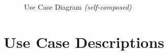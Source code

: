 \begin{figure}[h!]
\centering
{}
\caption{Use Case Diagram \textit{(self-composed)}}
\label{fig:use-case-diagram}
\end{figure}


\section{Use Case Descriptions}



